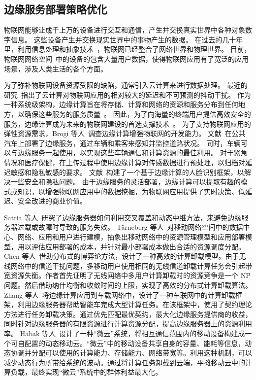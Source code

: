 \subsection{边缘服务部署策略优化}

物联网能够让成千上万的设备进行交互和通信，产生并交换真实世界中各种对象数字信息。
这些设备产生并交换现实世界中的事物产生的数据。
在过去的几十年里，利用信息处理和抽象技术~\cite{DBLP:journals/iotj/GanzPBC15}，物联网已经整合了网络世界和物理世界。
目前，物联网网络空间~\cite{DBLP:journals/cm/WangYXJD17}中的设备的包含大量用户数据，使得物联网应用有了宽泛的应用场景，涉及人类生活的各个方面。

为了弥补物联网设备资源受限的缺陷，通常引入云计算来进行数据处理。
最近的研究~\cite{DBLP:journals/iotj/RazzaqueMPC16}指出了云计算对物联网应用的相对较大的延迟和不可预测的抖动干扰。
作为一种系统级架构，边缘计算旨在将存储、计算和网络的资源和服务分布到任何地方，以确保这些服务的服务质量~\cite{AI201877}。
因此，为了向海量的终端用户提供高效安全的服务，边缘计算成为未来的物联网建设的首选支撑技术~\cite{DBLP:journals/iotj/LinYZYZZ17}。
为了支持物联网应用的弹性资源需求，Brogi 等人~\cite{DBLP:Journals/IOTj/BroGif17}调查边缘计算增强物联网的开发能力。
文献~\cite{DBLP:Journals/IOTj/BasuDanlS17}在公共汽车上部署了边缘服务，通过车辆和乘客来感知并监控道路状况。
同时，车辆可以与边缘服务一起使用，以实现这些车辆通信和计算资源\cite{DBLP:journals/tvt/HouLCWJC16}的最佳利用。
对于紧急情况和医疗保健，\cite{7466912}在上传过程中使用边缘计算对传感数据进行预处理，以归档对延迟敏感和隐私敏感的要求。
文献~\cite{7835115}构建了一个基于边缘计算的人脸识别框架，以解决一些安全和隐私问题。
由于边缘服务的灵活部署，边缘计算可以提取有趣的模式或知识，以增强物联网应用中的数据挖掘，为物联网应用提供了实时决策、低延迟、安全改进的商业价值。

Satria 等人~\cite{DBLP:journals/fgcs/SatriaPJ17}研究了边缘服务器如何利用交叉覆盖和动态中继方法，来避免边缘服务器过载或故障时导致的服务失效。
T{\"{a}}rneberg 等人~\cite{DBLP:journals/fgcs/TarnebergMWTEKE17}对移动网络空间中的数据中心、网络、应用和用户进行建模，抽象出移动网络中的资源管理模型和应用部署模型，用以评估应用部署的成本，并针对最小部署成本做出合适的资源调度分配。
Chen 等人~\cite{DBLP:journals/ton/ChenJLF16}借助分布式的博弈论方法，设计了一种高效的计算卸载模型。由于无线网络中的信道干扰问题，多移动用户使用相同的无线信道卸载计算任务会引起带宽资源失衡。作者首先证明了无线网络中多用户计算卸载时的资源竞争是一个 NP 问题。然后借助纳什均衡和收敛时间的上限，实现了高效的分布式计算卸载算法。
Zhang 等人~\cite{DBLP:conf/rndm/ZhangMLV016}将边缘计算应用到车载网络中，设计了一种车联网中的计算卸载框架，利用边缘服务器帮助智能车完成大型计算任务。在该框架中，使用了契约理论方法进行任务卸载决策。通过优先匹配最优契约，最大化边缘服务提供商的收益，同时针对边缘服务器的有限资源进行计算资源分配，提高边缘服务器上的资源利用率。
Habak 等人~\cite{DBLP:conf/IEEEcloud/HabakAHZ15}设计了一种“微云”系统，将相互通信范围内的移动设备构建成一个可自配置的动态移动云。“微云”中的移动设备共享自身的容量、能耗等信息，动态协调并分配可以使用的计算能力、存储能力、网络带宽等。利用这种机制，可以减少动态行为所带给系统的波动。通过将计算任务卸载到云端，平摊移动云中的计算负载，最终实现“微云”系统中的群体利益最大化。


